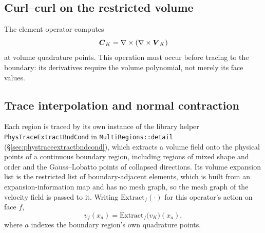 \subsection{Curl--curl on the restricted volume}

The element operator computes
\begin{equation}
  \boldsymbol{C}_K
  =\nabla\times(\nabla\times\boldsymbol{V}_K)
  \label{hopbc:eq:curlcurl}
\end{equation}
at volume quadrature points.  This operation must occur before tracing to the
boundary: its derivatives require the volume polynomial, not merely its face
values.

\subsection{Trace interpolation and normal contraction}
\label{hopbc:sec:trace-and-normal}

Each region is traced by its own instance of the library helper
\texttt{PhysTraceExtractBndCond} in \texttt{MultiRegions::detail}
(\S\ref{sec:phystraceextractbndcond}), which extracts a
volume field onto the physical points of a continuous boundary region,
including regions of mixed shape and order and the Gauss--Lobatto points of
collapsed directions. Its volume expansion list is the restricted list of
boundary-adjacent elements, which is built from an expansion-information map
and has no mesh graph, so the mesh graph of the velocity field is passed to
it. Writing \(\mathrm{Extract}_f(\cdot)\) for this
operator's action on face \(f\),
\begin{equation}
  v_f(x_a)=\mathrm{Extract}_f\bigl(v_K\bigr)(x_a),
  \label{hopbc:eq:trace-extract}
\end{equation}
where \(a\) indexes the boundary region's own quadrature points.

